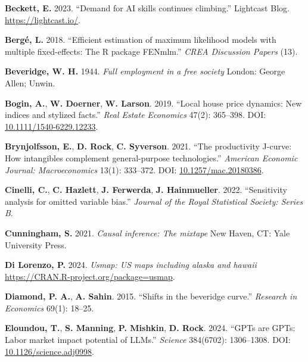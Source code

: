 \documentclass[
]{article}
\newlength{\cslhangindent}
\newenvironment{CSLReferences}[2] %
 {\begin{list}{}{%
  \setlength{\itemindent}{0pt}
  \setlength{\leftmargin}{0pt}
  \setlength{\parsep}{0pt}
  \ifodd #1
   \setlength{\leftmargin}{\cslhangindent}
   \setlength{\itemindent}{-1\cslhangindent}
  \fi
  \setlength{\itemsep}{#2\baselineskip}}}
 {\end{list}}
\begin{document}
\begin{CSLReferences}{1}{0}
\textbf{Beckett, E.} 2023. {``Demand for {AI} skills continues
climbing.''} Lightcast Blog. \url{https://lightcast.io/}.

\textbf{Bergé, L.} 2018. {``Efficient estimation of maximum likelihood
models with multiple fixed-effects: The {R} package {FENmlm}.''}
\emph{CREA Discussion Papers} (13).

\textbf{Beveridge, W. H.} 1944. \emph{Full employment in a free society}
London: George Allen; Unwin.

\textbf{Bogin, A.}, \textbf{W. Doerner}, \textbf{W. Larson}. 2019.
{``Local house price dynamics: New indices and stylized facts.''}
\emph{Real Estate Economics} 47(2): 365--398. DOI:
\href{https://doi.org/10.1111/1540-6229.12233}{10.1111/1540-6229.12233}.

\textbf{Brynjolfsson, E.}, \textbf{D. Rock}, \textbf{C. Syverson}. 2021.
{``The productivity {J}-curve: How intangibles complement
general-purpose technologies.''} \emph{American Economic Journal:
Macroeconomics} 13(1): 333--372. DOI:
\href{https://doi.org/10.1257/mac.20180386}{10.1257/mac.20180386}.

\textbf{Cinelli, C.}, \textbf{C. Hazlett}, \textbf{J. Ferwerda},
\textbf{J. Hainmueller}. 2022. {``Sensitivity analysis for omitted
variable bias.''} \emph{Journal of the Royal Statistical Society: Series
B}.

\textbf{Cunningham, S.} 2021. \emph{Causal inference: The mixtape} New
Haven, CT: Yale University Press.

\textbf{Di Lorenzo, P.} 2024. \emph{Usmap: US maps including alaska and
hawaii} \url{https://CRAN.R-project.org/package=usmap}.

\textbf{Diamond, P. A.}, \textbf{A. Sahin}. 2015. {``Shifts in the
beveridge curve.''} \emph{Research in Economics} 69(1): 18--25.

\textbf{Eloundou, T.}, \textbf{S. Manning}, \textbf{P. Mishkin},
\textbf{D. Rock}. 2024. {``{GPTs} are {GPTs}: Labor market impact
potential of {LLMs}.''} \emph{Science} 384(6702): 1306--1308. DOI:
\href{https://doi.org/10.1126/science.adj0998}{10.1126/science.adj0998}.


\end{CSLReferences}
\end{document}
